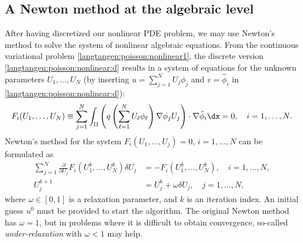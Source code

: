 \subsection{A Newton method at the algebraic level}
\label{langtangen:nonlinear:Newton:algebraic}
\label{Newton's method algebraic}

After having discretized our nonlinear PDE problem, we may
use Newton's method to solve the system of nonlinear algebraic equations.
From the continuous variational problem \eqref{langtangen:poisson:nonlinear1},
the discrete version \eqref{langtangen:poisson:nonlinear:d} results in a
system of equations for the unknown parameters $U_1,\ldots, U_N$
(by inserting $u = \sum_{j=1}^N U_j \phi_j$
and $v=\hat\phi_i$ in \eqref{langtangen:poisson:nonlinear:d}):
\begin{equation}
\label{langtangen:nonlinear:Newton:F1}
F_i(U_1,\ldots,U_N) \equiv
\sum_{j=1}^N
\int_\Omega \left( q\left(\sum_{\ell=1}^NU_\ell\phi_\ell\right)
\nabla \phi_j U_j\right)\cdot \nabla \hat\phi_i\dx = 0,\quad i=1,\ldots,N.
\end{equation}
Newton's method for the system $F_i(U_1,\ldots,U_j)=0$, $i=1,\ldots,N$
can be formulated as
\begin{align}
\sum_{j=1}^N
\frac{\partial}{\partial U_j} F_i(U_1^k,\ldots,U_N^k)\delta U_j
  &= -F_i(U_1^k,\ldots,U_N^k),\quad i=1,\ldots,N,
\\
U_j^{k+1} &= U_j^k + \omega\delta U_j,\quad j=1,\ldots,N,
\end{align}
where $\omega\in [0,1]$ is a relaxation parameter, and $k$ is an
iteration index. An initial guess $u^0$ must be provided to start the
algorithm.  The original Newton method has $\omega=1$, but in problems
where it is difficult to obtain convergence, so-called
\emph{under-relaxation} with $\omega < 1$ may
help.

